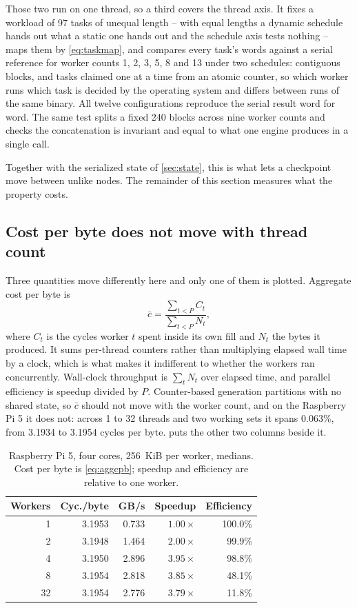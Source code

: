\documentclass[acmsmall,screen,review]{acmart}
\theoremstyle{acmdefinition}
\begin{document}
Those two run on one thread, so a third covers the thread axis. It fixes a
workload of 97 tasks of unequal length -- with equal lengths a dynamic schedule
hands out what a static one hands out and the schedule axis tests nothing --
maps them by \cref{eq:taskmap}, and compares every task's words against a serial
reference for worker counts 1, 2, 3, 5, 8 and 13 under two schedules:
contiguous blocks, and tasks claimed one at a time from an atomic counter, so
which worker runs which task is decided by the operating system and differs
between runs of the same binary. All twelve configurations reproduce the serial
result word for word. The same test splits a fixed 240 blocks across nine worker
counts and checks the concatenation is invariant and equal to what one engine
produces in a single call.

Together with the serialized state of \cref{sec:state}, this is what lets a
checkpoint move between unlike nodes. The remainder of this section measures
what the property costs.

\subsection{Cost per byte does not move with thread count}

Three quantities move differently here and only one of them is plotted.
Aggregate cost per byte is
\begin{equation}\label{eq:aggcpb}
  \bar{c} = \frac{\sum_{t<P} C_t}{\sum_{t<P} N_t},
\end{equation}
where $C_t$ is the cycles worker $t$ spent inside its own fill and $N_t$ the
bytes it produced. It sums per-thread counters rather than multiplying elapsed
wall time by a clock, which is what makes it indifferent to whether the workers
ran concurrently. Wall-clock throughput is $\sum_t N_t$ over elapsed time, and
parallel efficiency is speedup divided by $P$. Counter-based generation
partitions with no shared state, so $\bar{c}$ should not move with the worker
count, and on the Raspberry Pi 5 it does not: across 1 to 32 threads and two
working sets it spans 0.063\%, from 3.1934 to 3.1954 cycles per byte.
 puts the other two columns beside it.

\begin{table}[t]
\centering
\caption{Raspberry Pi 5, four cores, 256~KiB per worker, medians. Cost per byte
is \cref{eq:aggcpb}; speedup and efficiency are relative to one
worker.}\label{tab:piscaling}
\footnotesize
\begin{tabular}{rrrrr}
\toprule
Workers & Cyc./byte & GB/s & Speedup & Efficiency \\
\midrule
 1 & 3.1953 & 0.733 & $1.00\times$ & 100.0\% \\
 2 & 3.1948 & 1.464 & $2.00\times$ & 99.9\% \\
 4 & 3.1950 & 2.896 & $3.95\times$ & 98.8\% \\
 8 & 3.1954 & 2.818 & $3.85\times$ & 48.1\% \\
32 & 3.1954 & 2.776 & $3.79\times$ & 11.8\% \\
\bottomrule
\end{tabular}
\end{table}
\end{document}
